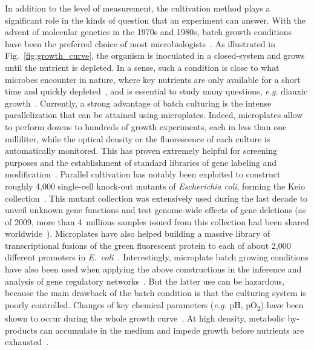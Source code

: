 In addition to the level of measurement, the cultivation method plays a significant role in the kinds of question that an experiment can answer.
With the advent of molecular genetics in the 1970s and 1980s, batch growth conditions have been the preferred choice of most microbiologists~\cite{hoskisson_continuous_2005}.
As illustrated in Fig.~\ref{fig:growth_curve}, the organism is inoculated in a closed-system and grows until the nutrient is depleted.
In a sense, such a condition is close to what microbes encounter in nature, where key nutrients are only available for a short time and quickly depleted~\cite{mcarthur_microbial_2006,menge_nitrogen_2012,hobbie_microbes_2013}, and is essential to study many questions, \textit{e.g.} diauxic growth~\cite{kremling_understanding_2015}.
Currently, a strong advantage of batch culturing is the intense parallelization that can be attained using microplates.
Indeed, microplates allow to perform dozens to hundreds of growth experiments, each in less than one milliliter, while the optical density or the fluorescence of each culture is automatically monitored.
This has proven extremely helpful for screening purposes and the establishment of standard libraries of gene labeling and modification~\cite{baba_construction_2006,zaslaver_comprehensive_2006}.
Parallel cultivation has notably been exploited to construct roughly 4,000 single-cell knock-out mutants of \textit{Escherichia coli}, forming the Keio collection~\cite{baba_construction_2006}.
This mutant collection was extensively used during the last decade to unveil unknown gene functions and test genome-wide effects of gene deletions (as of 2009, more than 4~millions samples issued from this collection had been shared worldwide~\cite{yamamoto_update_2009}).
Microplates have also helped building a massive library of transcriptional fusions of the green fluorescent protein to each of about 2,000 different promoters in \textit{E.~coli}~\cite{zaslaver_comprehensive_2006}.
Interestingly, microplate batch growing conditions have also been used when applying the above constructions in the inference and analysis of gene regulatory networks~\cite{gerosa_dissecting_2013,berthoumieux_shared_2013,keren_promoters_2013,
ronen_assigning_2002,stefan_inference_2015}.
But the latter use can be hazardous, because the main drawback of the batch condition is that the culturing system is poorly controlled.
Changes of key chemical parameters (\textit{e.g.} pH, pO\textsubscript{2}) have been shown to occur during the whole growth curve~\cite{bekker_changes_2007}. 
At high density, metabolic by-products can accumulate in the medium and impede growth before nutrients are exhausted~\cite{ackerman_accumulation_1974,lenski_chemical_2002,luli_comparison_1990}.
